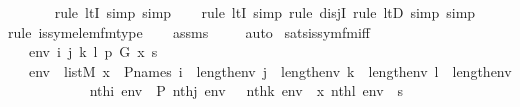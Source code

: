 \begin{isabellebody}
\ \ \ \ \ \ \isamarkupfalse%
{\isacharparenleft}{\kern0pt}rule\ ltI{\isacharcomma}{\kern0pt}\ simp{\isacharcomma}{\kern0pt}\ simp{\isacharparenright}{\kern0pt}{\isacharplus}{\kern0pt}\isanewline
\ \ \ \isamarkupfalse%
{\isacharparenleft}{\kern0pt}rule\ ltI{\isacharcomma}{\kern0pt}\ simp{\isacharcomma}{\kern0pt}\ rule\ disjI{}{\isacharcomma}{\kern0pt}\ rule\ ltD{\isacharcomma}{\kern0pt}\ simp{\isacharcomma}{\kern0pt}\ simp{\isacharparenright}{\kern0pt}\isanewline
\ \ \isamarkupfalse%
{\isacharparenleft}{\kern0pt}rule\ is{\isacharunderscore}{\kern0pt}sym{\isacharunderscore}{\kern0pt}elem{\isacharunderscore}{\kern0pt}fm{\isacharunderscore}{\kern0pt}type{\isacharparenright}{\kern0pt}\isanewline
\ \ \isamarkupfalse%
\ assms\ \isanewline
\ \ \isamarkupfalse%
\ auto%
\endisatagproof
{\isafoldproof}%
%
\isadelimproof
\isanewline
%
\endisadelimproof
\isanewline
{}\isamarkupfalse%
\ sats{\isacharunderscore}{\kern0pt}is{\isacharunderscore}{\kern0pt}sym{\isacharunderscore}{\kern0pt}fm{\isacharunderscore}{\kern0pt}iff\ {\isacharcolon}{\kern0pt}\ \isanewline
\ \ \ env\ i\ j\ k\ l\ p\ G\ x\ s\ \isanewline
\ \ \ {\isachardoublequoteopen}env\ {\isasymin}\ list{\isacharparenleft}{\kern0pt}M{\isacharparenright}{\kern0pt}{\isachardoublequoteclose}\ {\isachardoublequoteopen}x\ {\isasymin}\ P{\isacharunderscore}{\kern0pt}names{\isachardoublequoteclose}\ {\isachardoublequoteopen}i\ {\isacharless}{\kern0pt}\ length{\isacharparenleft}{\kern0pt}env{\isacharparenright}{\kern0pt}{\isachardoublequoteclose}\ {\isachardoublequoteopen}j\ {\isacharless}{\kern0pt}\ length{\isacharparenleft}{\kern0pt}env{\isacharparenright}{\kern0pt}{\isachardoublequoteclose}\ {\isachardoublequoteopen}k\ {\isacharless}{\kern0pt}\ length{\isacharparenleft}{\kern0pt}env{\isacharparenright}{\kern0pt}{\isachardoublequoteclose}\ {\isachardoublequoteopen}l\ {\isacharless}{\kern0pt}\ length{\isacharparenleft}{\kern0pt}env{\isacharparenright}{\kern0pt}{\isachardoublequoteclose}\ \isanewline
\ \ \ \ \ \ \ \ \ \ {\isachardoublequoteopen}nth{\isacharparenleft}{\kern0pt}i{\isacharcomma}{\kern0pt}\ env{\isacharparenright}{\kern0pt}\ {\isacharequal}{\kern0pt}\ P{\isachardoublequoteclose}\ {\isachardoublequoteopen}nth{\isacharparenleft}{\kern0pt}j{\isacharcomma}{\kern0pt}\ env{\isacharparenright}{\kern0pt}\ {\isacharequal}{\kern0pt}\ {\isasymG}{\isachardoublequoteclose}\ {\isachardoublequoteopen}nth{\isacharparenleft}{\kern0pt}k{\isacharcomma}{\kern0pt}\ env{\isacharparenright}{\kern0pt}\ {\isacharequal}{\kern0pt}\ x{\isachardoublequoteclose}\ {\isachardoublequoteopen}nth{\isacharparenleft}{\kern0pt}l{\isacharcomma}{\kern0pt}\ env{\isacharparenright}{\kern0pt}\ {\isacharequal}{\kern0pt}\ s{\isachardoublequoteclose}\ \ \isanewline

\end{isabellebody}
